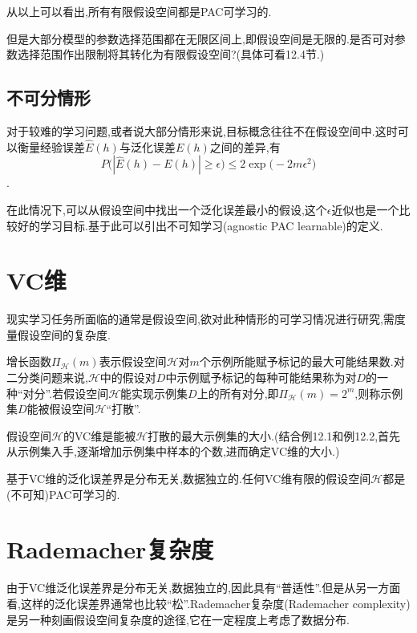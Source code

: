 从以上可以看出,所有有限假设空间都是PAC可学习的.

但是大部分模型的参数选择范围都在无限区间上,即假设空间是无限的.是否可对参数选择范围作出限制将其转化为有限假设空间?(具体可看12.4节.)

\subsection{不可分情形}

对于较难的学习问题,或者说大部分情形来说,目标概念往往不在假设空间中.这时可以衡量经验误差$\widehat E(h)$与泛化误差$E(h)$之间的差异,有
\begin{equation}
P\Big(|\widehat E(h)-E(h)|\ge\epsilon\Big)\le2\exp\Big(-2m\epsilon^2\Big)
\end{equation}
.

在此情况下,可以从假设空间中找出一个泛化误差最小的假设,这个$\epsilon$近似也是一个比较好的学习目标.基于此可以引出不可知学习(agnostic PAC learnable)的定义.

\section{VC维}

现实学习任务所面临的通常是假设空间,欲对此种情形的可学习情况进行研究,需度量假设空间的复杂度.

增长函数$\Pi_\mathcal H(m)$表示假设空间$\mathcal H$对$m$个示例所能赋予标记的最大可能结果数.对二分类问题来说,$\mathcal H$中的假设对$D$中示例赋予标记的每种可能结果称为对$D$的一种``对分''.若假设空间$\mathcal H$能实现示例集$D$上的所有对分,即$\Pi_\mathcal H(m)=2^m$,则称示例集$D$能被假设空间$\mathcal H$``打散''.

假设空间$\mathcal H$的VC维是能被$\mathcal H$打散的最大示例集的大小.(结合例12.1和例12.2,首先从示例集入手,逐渐增加示例集中样本的个数,进而确定VC维的大小.)

基于VC维的泛化误差界是分布无关,数据独立的.任何VC维有限的假设空间$\mathcal H$都是(不可知)PAC可学习的.

\section{Rademacher复杂度}

由于VC维泛化误差界是分布无关,数据独立的,因此具有``普适性''.但是从另一方面看,这样的泛化误差界通常也比较``松''.Rademacher复杂度(Rademacher complexity)是另一种刻画假设空间复杂度的途径,它在一定程度上考虑了数据分布.

